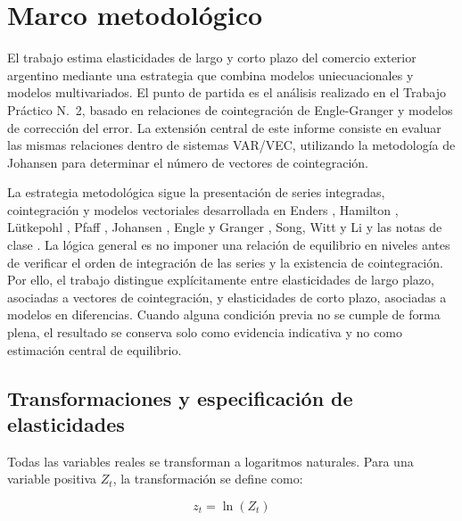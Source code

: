 \documentclass[11pt,a4paper]{article}
\begin{document}
	\section{Marco metodológico}
	\label{sec:marco-metodologico}
	
	El trabajo estima elasticidades de largo y corto plazo del comercio exterior
	argentino mediante una estrategia que combina modelos uniecuacionales y modelos
	multivariados. El punto de partida es el análisis realizado en el Trabajo
	Práctico N.\textdegree~2, basado en relaciones de cointegración de
	Engle-Granger y modelos de corrección del error. La extensión central de este
	informe consiste en evaluar las mismas relaciones dentro de sistemas VAR/VEC,
	utilizando la metodología de Johansen para determinar el número de vectores de
	cointegración.
	
	La estrategia metodológica sigue la presentación de series integradas,
	cointegración y modelos vectoriales desarrollada en Enders
	\cite{enders_2014}, Hamilton \cite{hamilton_1994}, Lütkepohl
	\cite{lutkepohl_2005}, Pfaff \cite{pfaff_2008}, Johansen
	\cite{johansen_1995}, Engle y Granger \cite{engle_granger_1987}, Song, Witt y
	Li \cite{song_witt_li_2008} y las notas de clase \cite{fabris_2026}. La lógica
	general es no imponer una relación de equilibrio en niveles antes de verificar
	el orden de integración de las series y la existencia de cointegración. Por
	ello, el trabajo distingue explícitamente entre elasticidades de largo plazo,
	asociadas a vectores de cointegración, y elasticidades de corto plazo, asociadas
	a modelos en diferencias. Cuando alguna condición previa no se cumple de forma
	plena, el resultado se conserva solo como evidencia indicativa y no como
	estimación central de equilibrio.
	
	\subsection{Transformaciones y especificación de elasticidades}
	\label{subsec:metodologia-transformaciones}
	
	Todas las variables reales se transforman a logaritmos naturales. Para una
	variable positiva \(Z_t\), la transformación se define como:
	
	\begin{equation}
		z_t = \ln(Z_t)
		\label{eq:tp3-transformacion-logaritmica}
	\end{equation}
	
\end{document}

